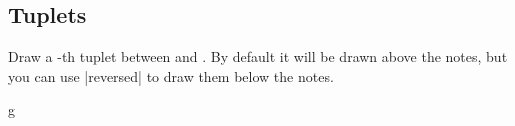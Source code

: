 \subsection{Tuplets}\label{sec:line:tuplet}
\begin{command}{\tmtuplets{}}
  Draw a -th tuplet between  and . 
  By default it will be drawn above the notes, but you can use |reversed| to draw 
  them below the notes.
\end{command}
\begin{codeexample}[]
\begin{tmline}
\begin{tmstaff}{g}{}
  \begin{tmbeam}
  \end{tmbeam}
\end{tmstaff}
\end{tmline}
\end{codeexample}
